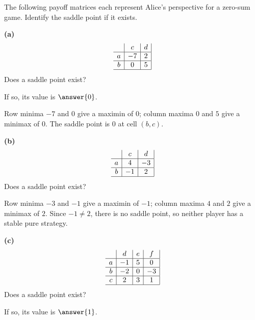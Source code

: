 \documentclass[12pt]{ximera}
\begin{document}
\begin{problem}
The following payoff matrices each represent Alice's perspective for a zero-sum game.
Identify the saddle point if it exists.

\begin{prompt}
\textbf{(a)}
\[
\begin{array}{c|c|c|}
\phantom{|} & c & d \\\hline
a & -7 & 2 \\\hline
b & 0 & 5 \\\hline
\end{array}
\]
Does a saddle point exist?
\begin{multipleChoice}
\end{multipleChoice}
If so, its value is $\answer{0}$.

\begin{feedback}
Row minima $-7$ and $0$ give a maximin of $0$; column maxima $0$ and $5$ give a minimax
of $0$. The saddle point is $0$ at cell $(b,c)$.
\end{feedback}
\end{prompt}

\begin{prompt}
\textbf{(b)}
\[
\begin{array}{c|c|c|}
\phantom{|} & c & d \\\hline
a & 4 & -3 \\\hline
b & -1 & 2 \\\hline
\end{array}
\]
Does a saddle point exist?
\begin{multipleChoice}
\end{multipleChoice}

\begin{feedback}
Row minima $-3$ and $-1$ give a maximin of $-1$; column maxima $4$ and $2$ give a minimax
of $2$. Since $-1 \neq 2$, there is no saddle point, so neither player has a stable pure
strategy.
\end{feedback}
\end{prompt}

\begin{prompt}
\textbf{(c)}
\[
\begin{array}{c|c|c|c|}
\phantom{|} & d & e & f \\\hline
a & -1 & 5 & 0 \\\hline
b & -2 & 0 & -3 \\\hline
c & 2 & 3 & 1 \\\hline
\end{array}
\]
Does a saddle point exist?
\begin{multipleChoice}
\end{multipleChoice}
If so, its value is $\answer{1}$.


\end{prompt}
\end{problem}
\end{document}
